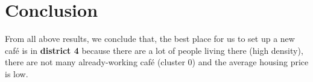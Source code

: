 \documentclass[12pt,a4paper]{article}
\begin{document}
\section{Conclusion}

From all above results, we conclude that, the best place for us to set up a new café is in \textbf{district 4} because there are a lot of people living there (high density), there are not many already-working café (cluster 0) and the average housing price is low.




\end{document}

